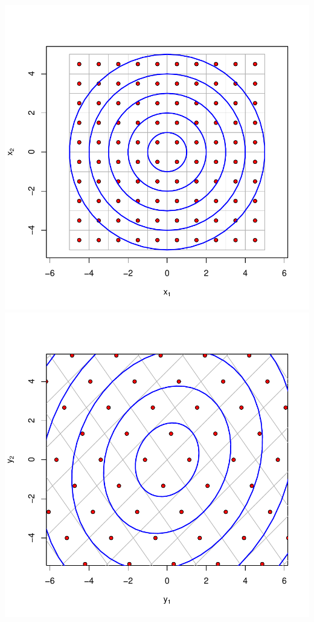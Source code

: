 \documentclass[landscape,footrule]{foils}
\begin{document}
\begin{center}
\includegraphics[scale=0.55]{original-contours.pdf}
\includegraphics[scale=0.55]{transformed-contours.pdf}
\end{center}\vspace*{-0cm}
\end{document}
